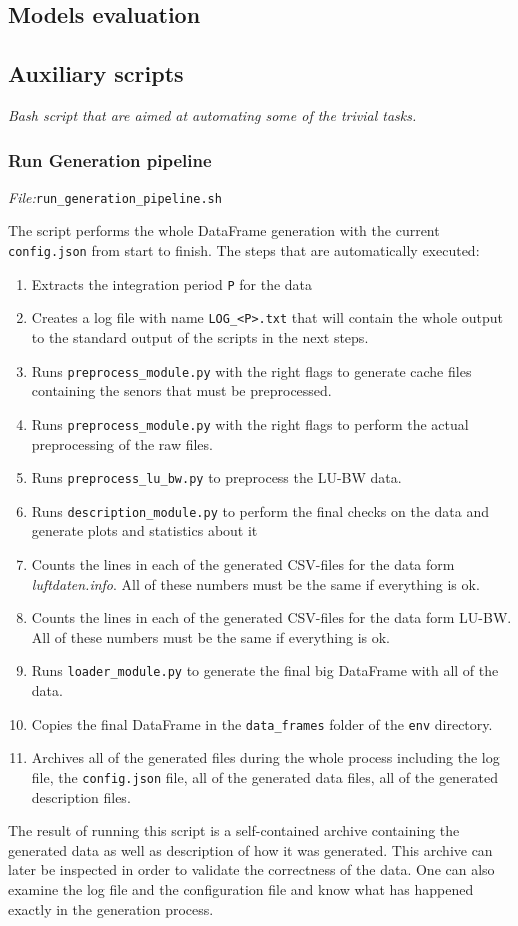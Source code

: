 \documentclass[12pt,a4paper,twoside]{scrartcl}
\numberwithin{equation}{section}
\begin{document}
\subsection{Models evaluation}
\label{sec:models-eval}

\subsection{Auxiliary scripts}
\label{sec:aux-scripts}
\noindent\emph{Bash script that are aimed at automating some of the trivial tasks.} 
\subsubsection{Run Generation pipeline}
\label{sec:gen-pipe}
\noindent\emph{File:}\texttt{run\_generation\_pipeline.sh}

The script performs the whole DataFrame generation with the current \texttt{config.json} from start to finish. The steps that are automatically executed:
\begin{enumerate}
\item Extracts the integration period \texttt{P} for the data
\item Creates a log file with name \texttt{LOG\_<P>.txt} that will contain the whole output to the standard output of the scripts in the next steps.
\item Runs \texttt{preprocess\_module.py} with the right flags to generate cache files containing the senors that must be preprocessed.
\item Runs \texttt{preprocess\_module.py} with the right flags to perform the actual preprocessing of the raw files.
\item Runs \texttt{preprocess\_lu\_bw.py} to preprocess the LU-BW data.
\item Runs \texttt{description\_module.py} to perform the final checks on the data and generate plots and statistics about it
\item Counts the lines in each of the generated CSV-files for the data form \emph{luftdaten.info}. All of these numbers must be the same if everything is ok.
\item Counts the lines in each of the generated CSV-files for the data form LU-BW. All of these numbers must be the same if everything is ok.
\item Runs \texttt{loader\_module.py} to generate the final big DataFrame with all of the data.
\item Copies the final DataFrame in the \texttt{data\_frames} folder of the \texttt{env} directory.
\item Archives all of the generated files during the whole process including the log file, the \texttt{config.json} file, all of the generated data files, all of the generated description files.
\end{enumerate}
The result of running this script is a self-contained archive containing the generated data as well as description of how it was generated. This archive can later be inspected in order to validate the correctness of the data. One can also examine the log file and the configuration file and know what has happened exactly in the generation process.
\end{document}
